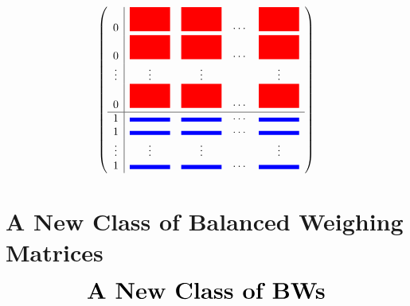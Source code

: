 \documentclass{beamer}
\newcommand{\RR}[1]{\textcolor{red}{#1}}
\newcommand{\BB}[1]{\textcolor{blue}{#1}}
\begin{document}
{
  \newcommand{\rbox}{\RR{\mbox{\rule{0.5in}{0.3in}}}}
  \newcommand{\bbox}{\BB{\mbox{\rule{0.5in}{0.05in}}}}

  \begin{frame}

    \[
      \left(
        \begin{array}{c|cccc}
          0 & \rbox & \rbox & \cdots & \rbox \\
          0 & \rbox & \rbox & \cdots & \rbox \\
          \vdots & \vdots & \vdots &  & \vdots \\
          0 & \rbox & \rbox & \cdots & \rbox \\ \hline
          1 & \bbox & \bbox & \cdots & \bbox \\
          1 & \bbox & \bbox & \cdots & \bbox \\
          \vdots & \vdots & \vdots &  & \vdots \\
          1 & \bbox & \bbox & \cdots & \bbox \\
        \end{array}
      \right)
    \]
    
  \end{frame}
}


\section{A New Class of Balanced Weighing Matrices}

\begin{frame}
  \[
    \text{\huge\bf A New Class of BWs}
  \]
\end{frame}



\end{document}
